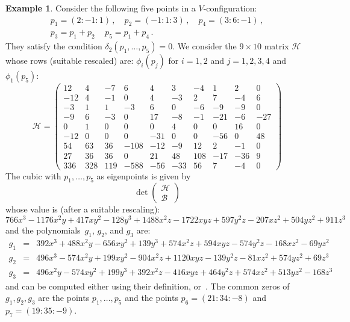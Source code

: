 \documentclass{amsart}
\theoremstyle{plain}
\theoremstyle{definition}
\newtheorem{es}[lemma]{Example}
\begin{document}
\begin{es} Consider the following five points in a $V$-configuration:
\begin{gather*}
p_1 = (2: -1: 1) \,, \quad p_2 = (-1: 1: 3) \,, \quad p_4 = (3: 6: -1) \,, \\
p_3 = p_1+p_2 \, \quad p_5 = p_1+p_4 \,.
\end{gather*}
They satisfy the condition $\delta_2(p_1, \dots, p_5) = 0$.
We consider the $9\times 10$ matrix $\mathcal{H}$ whose rows
(suitable rescaled) are:
$\phi_i(p_j)$ for $i = 1, 2$ and $j = 1, 2, 3, 4$ and $\phi_1(p_5)$:
%
\[
\mathcal{H} =
\left(\begin{array}{rrrrrrrrrr}
12 & 4 & -7 & 6 & 4 & 3 & -4 & 1 & 2 & 0 \\
-12 & 4 & -1 & 0 & 4 & -3 & 2 & 7 & -4 & 6 \\
-3 & 1 & 1 & -3 & 6 & 0 & -6 & -9 & -9 & 0 \\
-9 & 6 & -3 & 0 & 17 & -8 & -1 & -21 & -6 & -27 \\
0 & 1 & 0 & 0 & 0 & 4 & 0 & 0 & 16 & 0 \\
-12 & 0 & 0 & 0 & -31 & 0 & 0 & -56 & 0 & 48 \\
54& 63& 36& -108& -12& -9& 12& 2& -1& 0\\
27 & 36 & 36 & 0 & 21 & 48 & 108 & -17 & -36 & 9 \\
336& 328& 119& -588& -56& -33& 56& 7& -4& 0
\end{array}
\right)
\]
%
The cubic with $p_1, \dots, p_5$ as eigenpoints is given by
%
\[
\det \left(
\begin{array}{c}
\mathcal{H}\\
\mathcal{B}
\end{array}
\right)
\]
%
whose value is (after a suitable rescaling):
%
\[
766x^3 - 1176x^2y + 417xy^2 - 128y^3 + 1488x^2z - 1722xyz
+ 597y^2z - 207xz^2 + 504yz^2 + 911z^3
\]
%
and the polynomials~$g_1$, $g_2$, and $g_3$ are:
\begin{eqnarray*}
g_1 & = & 392x^3 + 488x^2y - 656xy^2 + 139y^3 + 574x^2z + 594xyz - 574y^2z - 168xz^2 - 69yz^2\\
g_2 & = & 496x^3 - 574x^2y + 199xy^2 - 904x^2z + 1120xyz - 139y^2z - 81xz^2 + 574yz^2 + 69z^3\\
g_3 & = & 496x^2y - 574xy^2 + 199y^3 + 392x^2z - 416xyz + 464y^2z + 574xz^2 + 513yz^2 - 168z^3
\end{eqnarray*}
and can be computed either using their definition,
or~.
The common zeros of $g_1, g_2, g_3$ are the points $p_1, \dots, p_5$
and the points $p_6 = (21: 34: -8)$ and $p_7 = (19: 35: -9)$.
\end{es}
\end{document}
